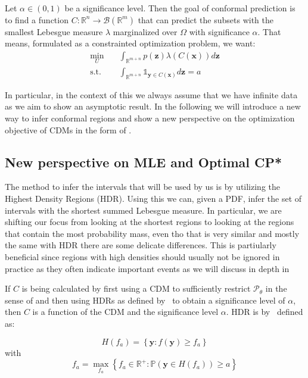 Let $\alpha \in (0,1)$ be a significance level. Then the goal of conformal prediction is to find a function $C : \mathbb{R}^n \to \mathcal{B}(\mathbb{R}^m)$ that can predict the subsets with the smallest Lebesgue measure $\lambda$ marginalized over $\Omega$ with significance $\alpha$. That means, formulated as a constrainted optimization problem, we want:
\begin{align}
    \min_U \quad      & \int_{\mathbb{R}^{m + n}} p(\mathbf{z})
    \lambda(C(\mathbf{x}))
    d\mathbf{z}
    \\
    \text{s.t.} \quad & \int_{\mathbb{R}^{m + n}} \mathds{1}_{\mathbf{y} \in
    C(\mathbf{x})} d\mathbf{z} = a
\end{align}

In particular, in the context of this  we always assume that we have infinite data as we aim to show an asymptotic result. In the following  we will introduce a new way to infer conformal regions and show a new perspective on the optimization objective of CDMs in the form of .

\subsection{New perspective on MLE and Optimal CP*}\label{sec:optimal_cp_proofs}

The method to infer the intervals that will be used by us is by utilizing the Highest Density Regions (HDR). Using this we can, given a PDF, infer the set of intervals with the shortest summed Lebesgue measure. In particular, we are shifting our focus from looking at the shortest regions to looking at the regions that contain the most probability mass, even tho that is very similar and mostly the same with HDR there are some delicate differences. This is partiularly beneficial since regions with high densities should usually not be ignored in practice as they often indicate important events as we will discuss in depth in 

If $C$ is being calculated by first using a CDM to sufficiently restrict $\mathscr{P}_\theta$ in the sense of  and then using HDRs as defined by~\cite{hyndman1996computing} to obtain a significance level of $\alpha$, then $C$ is a function of the CDM and the significance level $\alpha$. HDR is by~\cite{hyndman1996computing} defined as:

\[
    H\left(f_a\right)=\left\{\mathbf{y}: f(\mathbf{y}) \geq f_a\right\}
\]
with
\[
    f_a = \max_{f_a} \left\{f_a \in \mathbb{R^+}: \mathbb{P}\left(\mathbf{y}
    \in
    H(f_a)\right) \geq a \right\}
\]

